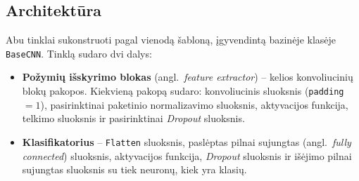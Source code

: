 \subsection{Architektūra}
\label{subsec:architektura}

Abu tinklai sukonstruoti pagal vienodą šabloną, įgyvendintą bazinėje klasėje \texttt{BaseCNN}. Tinklą sudaro dvi dalys:
\begin{itemize}
    \item \textbf{Požymių išskyrimo blokas} (angl.~\textit{feature extractor}) – kelios konvoliucinių blokų pakopos. Kiekvieną pakopą sudaro: konvoliucinis sluoksnis (\texttt{padding}~$=1$), pasirinktinai paketinio normalizavimo sluoksnis, aktyvacijos funkcija, telkimo sluoksnis ir pasirinktinai \textit{Dropout} sluoksnis.
    \item \textbf{Klasifikatorius} – \texttt{Flatten} sluoksnis, paslėptas pilnai sujungtas (angl.~\textit{fully connected}) sluoksnis, aktyvacijos funkcija, \textit{Dropout} sluoksnis ir išėjimo pilnai sujungtas sluoksnis su tiek neuronų, kiek yra klasių.
\end{itemize}



